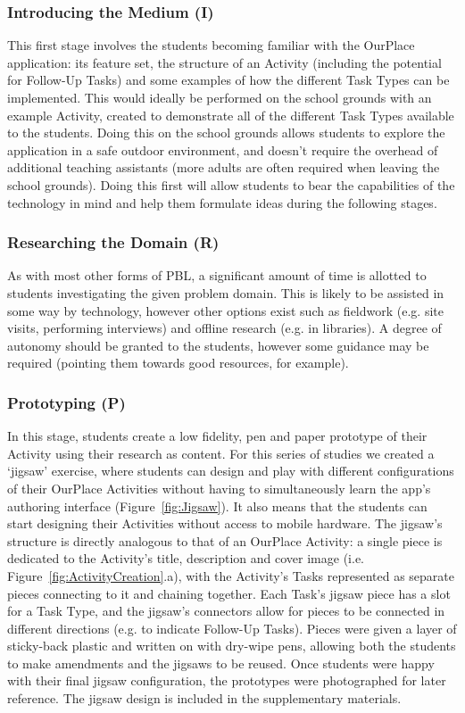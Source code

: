\documentclass[,hyphens]{sigchi}
\begin{document}
\subsubsection{Introducing the Medium (I)}
This first stage involves the students becoming familiar with the OurPlace application: its feature set, the structure of an Activity (including the potential for Follow-Up Tasks) and some examples of how the different Task Types can be implemented. This would ideally be performed on the school grounds with an example Activity, created to demonstrate all of the different Task Types available to the students. Doing this on the school grounds allows students to explore the application in a safe outdoor environment, and doesn't require the overhead of additional teaching assistants (more adults are often required when leaving the school grounds). Doing this first will allow students to bear the capabilities of the technology in mind and help them formulate ideas during the following stages.

\subsubsection{Researching the Domain (R)}
As with most other forms of PBL, a significant amount of time is allotted to students investigating the given problem domain. This is likely to be assisted in some way by technology, however other options exist such as fieldwork (e.g. site visits, performing interviews) and offline research (e.g. in libraries). A degree of autonomy should be granted to the students, however some guidance may be required (pointing them towards good resources, for example).

\subsubsection{Prototyping (P)}
In this stage, students create a low fidelity, pen and paper prototype of their Activity using their research as content. For this series of studies we created a `jigsaw' exercise, where students can design and play with different configurations of their OurPlace Activities without having to simultaneously learn the app's authoring interface (Figure~\ref{fig:Jigsaw}). It also means that the students can start designing their Activities without access to mobile hardware. The jigsaw's structure is directly analogous to that of an OurPlace Activity: a single piece is dedicated to the Activity's title, description and cover image (i.e. Figure~\ref{fig:ActivityCreation}.a), with the Activity's Tasks represented as separate pieces connecting to it and chaining together. Each Task's jigsaw piece has a slot for a Task Type, and the jigsaw's connectors allow for pieces to be connected in different directions (e.g. to indicate Follow-Up Tasks). Pieces were given a layer of sticky-back plastic and written on with dry-wipe pens, allowing  both the students to make amendments and the jigsaws to be reused. Once students were happy with their final jigsaw configuration, the prototypes were photographed for later reference. The jigsaw design is included in the supplementary materials.
\end{document}
